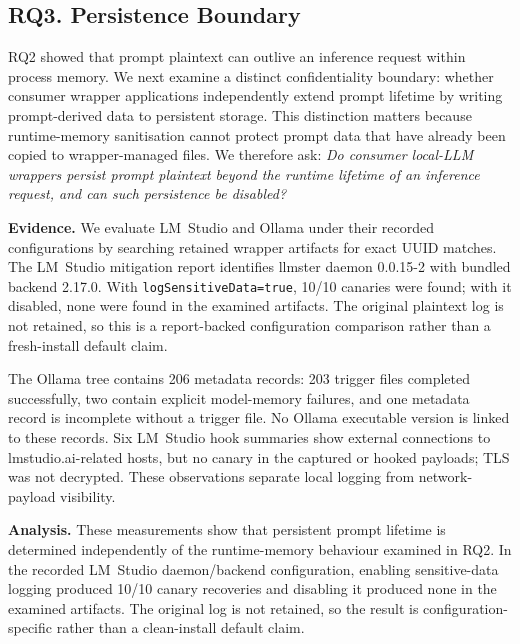\documentclass[journal,tifs]{IEEEtran}
\begin{document}
\subsection{RQ3. Persistence Boundary}
\label{sec:rq3}

RQ2 showed that prompt plaintext can outlive an inference request within
process memory. We next examine a distinct confidentiality boundary:
whether consumer wrapper applications independently extend prompt
lifetime by writing prompt-derived data to persistent storage. This distinction matters because runtime-memory sanitisation cannot
protect prompt data that have already been copied to wrapper-managed
files. We therefore ask: \emph{Do consumer local-LLM wrappers persist prompt plaintext beyond the
runtime lifetime of an inference request, and can such persistence be
disabled?}



{\bf Evidence.}
We evaluate LM~Studio and Ollama under their recorded configurations by
searching retained wrapper artifacts for exact UUID matches. The LM~Studio
mitigation report identifies llmster daemon 0.0.15-2 with bundled backend
2.17.0. With \texttt{logSensitiveData=true}, 10/10 canaries were found;
with it disabled, none were found in the examined artifacts. The original
plaintext log is not retained, so this is a report-backed configuration
comparison rather than a fresh-install default claim.

The Ollama tree contains 206 metadata records: 203 trigger files completed
successfully, two contain explicit model-memory failures, and one metadata
record is incomplete without a trigger file. No Ollama executable version
is linked to these records. Six LM~Studio hook summaries show external
connections to lmstudio.ai-related hosts, but no canary in the captured or
hooked payloads; TLS was not decrypted. These observations separate local
logging from network-payload visibility.


{\bf Analysis.}
These measurements show that persistent prompt lifetime is determined
independently of the runtime-memory behaviour examined in RQ2. In the
recorded LM~Studio daemon/backend configuration, enabling sensitive-data
logging produced 10/10 canary recoveries and disabling it produced none in
the examined artifacts. The original log is not retained, so the result is
configuration-specific rather than a clean-install default claim.
\end{document}
